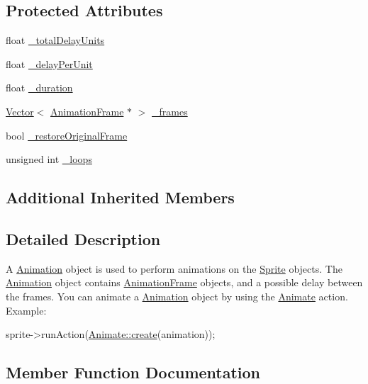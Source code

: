 \subsection*{Protected Attributes}
\begin{DoxyCompactItemize}
\item 
float \hyperlink{classAnimation_aa05672efcbdd64ac9247f052e2d0564d}{\+\_\+total\+Delay\+Units}
\item 
float \hyperlink{classAnimation_abb0374240f4f6c443aed804dca1e0a7a}{\+\_\+delay\+Per\+Unit}
\item 
float \hyperlink{classAnimation_ae49a146ade26d6f57c0630ad28f0acb3}{\+\_\+duration}
\item 
\hyperlink{classVector}{Vector}$<$ \hyperlink{classAnimationFrame}{Animation\+Frame} $\ast$ $>$ \hyperlink{classAnimation_a276e250f2ed2a8139d1796a2fcc8837c}{\+\_\+frames}
\item 
bool \hyperlink{classAnimation_ad03c361dbbe11f8a778a98e8c1afd517}{\+\_\+restore\+Original\+Frame}
\item 
unsigned int \hyperlink{classAnimation_a5742f724ac7b63cce171f2435e672bb1}{\+\_\+loops}
\end{DoxyCompactItemize}
\subsection*{Additional Inherited Members}


\subsection{Detailed Description}
A \hyperlink{classAnimation}{Animation} object is used to perform animations on the \hyperlink{classSprite}{Sprite} objects. The \hyperlink{classAnimation}{Animation} object contains \hyperlink{classAnimationFrame}{Animation\+Frame} objects, and a possible delay between the frames. You can animate a \hyperlink{classAnimation}{Animation} object by using the \hyperlink{classAnimate}{Animate} action. Example\+: 
\begin{DoxyCode}
sprite->runAction(\hyperlink{classAnimate_aaa1198ded0f8c25bd265ed8b0b9d8a1c}{Animate::create}(animation));
\end{DoxyCode}
 

\subsection{Member Function Documentation}
\mbox{\label{classAnimation_a560fb49ea8765f6a13ebb272effbc7cb}} 
